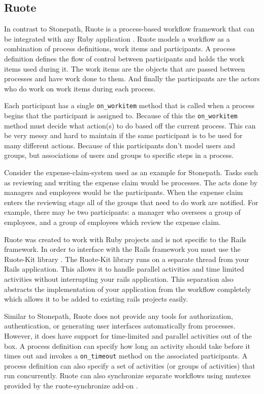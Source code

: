 \documentclass[document.tex]{subfiles}
\begin{document}
\subsection {Ruote}

In contrast to Stonepath, Ruote is a process-based workflow framework that can be integrated with any Ruby application \cite{ruote}. Ruote models a workflow as a combination of process definitions, work items and participants. A process definition defines the flow of control between participants and holds the work items used during it. The work items are the objects that are passed between processes and have work done to them. And finally the participants are the actors who do work on work items during each process. 

Each participant has a single \verb!on_workitem! method that is called when a process begins that the participant is assigned to. Because of this the \verb!on_workitem! method must decide what action(s) to do based off the current process. This can be very messy and hard to maintain if the same participant is to be used for many different actions. Because of this participants don't model users and groups, but associations of users and groups to specific steps in a process.

Consider the expense-claim-system used as an example for Stonepath. Tasks such as reviewing and writing the expense claim would be processes. The acts done by managers and employees would be the participants. When the expense claim enters the reviewing stage all of the groups that need to do work are notified. For example, there may be two participants: a manager who oversees a group of employees, and a group of employees which review the expense claim.

Ruote was created to work with Ruby projects and is not specific to the Rails framework. In order to interface with the Rails framework you must use the Ruote-Kit library \cite{ruote-kit}. The Ruote-Kit library runs on a separate thread from your Rails application. This allows it to handle parallel activities and time limited activities without interrupting your rails application. This separation also abstracts the implementation of your application from the workflow completely which allows it to be added to existing rails projects easily.

Similar to Stonepath, Ruote does not provide any tools for authorization, authentication, or generating user interfaces automatically from processes. However, it does have support for time-limited and parallel activities out of the box. A process definition can specify how long an activity should take before it times out and invokes a \verb!on_timeout! method on the associated participants. A process definition can also specify a set of activities (or groups of activities) that run concurrently. Ruote can also synchronize separate workflows using mutexes provided by the ruote-synchronize add-on \cite{ruote-synchronize}.
\end{document}
